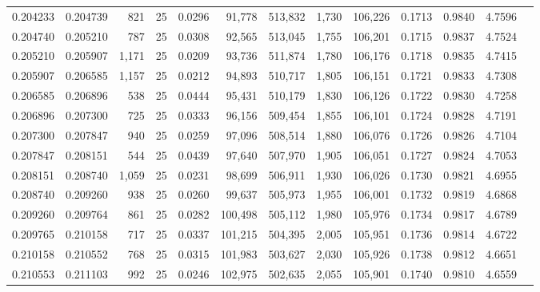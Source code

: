 \begin{tabular}{rrrrrrrrrrrrr}
0.204233 & 0.204739 &   821 &  25 &                                     0.0296 &  91,778 & 513,832 &   1,730 & 106,226 & 0.1713 & 0.9840 & 4.7596 \\
0.204740 & 0.205210 &   787 &  25 &                                     0.0308 &  92,565 & 513,045 &   1,755 & 106,201 & 0.1715 & 0.9837 & 4.7524 \\
0.205210 & 0.205907 & 1,171 &  25 &                                     0.0209 &  93,736 & 511,874 &   1,780 & 106,176 & 0.1718 & 0.9835 & 4.7415 \\
0.205907 & 0.206585 & 1,157 &  25 &                                     0.0212 &  94,893 & 510,717 &   1,805 & 106,151 & 0.1721 & 0.9833 & 4.7308 \\
0.206585 & 0.206896 &   538 &  25 &                                     0.0444 &  95,431 & 510,179 &   1,830 & 106,126 & 0.1722 & 0.9830 & 4.7258 \\
0.206896 & 0.207300 &   725 &  25 &                                     0.0333 &  96,156 & 509,454 &   1,855 & 106,101 & 0.1724 & 0.9828 & 4.7191 \\
0.207300 & 0.207847 &   940 &  25 &                                     0.0259 &  97,096 & 508,514 &   1,880 & 106,076 & 0.1726 & 0.9826 & 4.7104 \\
0.207847 & 0.208151 &   544 &  25 &                                     0.0439 &  97,640 & 507,970 &   1,905 & 106,051 & 0.1727 & 0.9824 & 4.7053 \\
0.208151 & 0.208740 & 1,059 &  25 &                                     0.0231 &  98,699 & 506,911 &   1,930 & 106,026 & 0.1730 & 0.9821 & 4.6955 \\
0.208740 & 0.209260 &   938 &  25 &                                     0.0260 &  99,637 & 505,973 &   1,955 & 106,001 & 0.1732 & 0.9819 & 4.6868 \\
0.209260 & 0.209764 &   861 &  25 &                                     0.0282 & 100,498 & 505,112 &   1,980 & 105,976 & 0.1734 & 0.9817 & 4.6789 \\
0.209765 & 0.210158 &   717 &  25 &                                     0.0337 & 101,215 & 504,395 &   2,005 & 105,951 & 0.1736 & 0.9814 & 4.6722 \\
0.210158 & 0.210552 &   768 &  25 &                                     0.0315 & 101,983 & 503,627 &   2,030 & 105,926 & 0.1738 & 0.9812 & 4.6651 \\
0.210553 & 0.211103 &   992 &  25 &                                     0.0246 & 102,975 & 502,635 &   2,055 & 105,901 & 0.1740 & 0.9810 & 4.6559 \\

\end{tabular}
